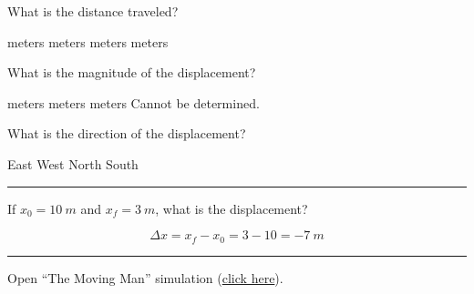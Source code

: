 \documentclass[]{exam}
\begin{document}
\begin{questions}
\question \label{ques:Skier_start}
What is the distance traveled?

\begin{choices}
 meters
 meters
 meters
 meters
\end{choices}

\question
What is the magnitude of the displacement?

\begin{choices}
 meters
 meters
 meters
\choice Cannot be determined.
\end{choices}

\question \label{ques:Skier_end}
What is the direction of the displacement?

\begin{choices}
\choice East
\CorrectChoice West
\choice North   
\choice South
\end{choices}

\vspace{1em} \hrule

\question
If $x_0 = \SI{10}{m}$ and $x_f = \SI{3}{m}$, what is the displacement?

\begin{solution}
\begin{equation*}
    \Delta{x} = x_f - x_0 = 3 - 10 = \SI{-7}{m} 
\end{equation*}
\end{solution}


\vspace{1em}
\hrule

\question
Open ``The Moving Man'' simulation (\href{https://archive.cnx.org/specials/e2ca52af-8c6b-450e-ac2f-9300b38e8739/moving-man/}{click here}). 

\end{questions}
\end{document}
